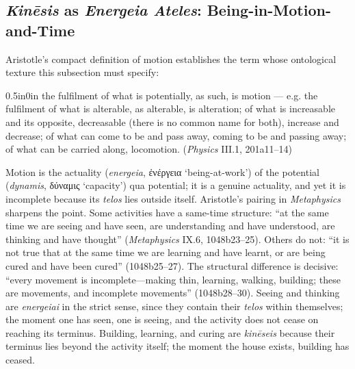 \documentclass{article}
\newcommand{\gk}[1]{{\greekfont #1}}
\begin{document}
\subsection{\textit{Kinēsis} as \textit{Energeia Ateles}: Being-in-Motion-and-Time}

Aristotle's compact definition of motion establishes the term whose ontological texture this subsection must specify:
\begin{adjustwidth}{0.5in}{0in}
the fulfilment of what is potentially, as such, is motion --- e.g. the fulfilment of what is alterable, as alterable, is alteration; of what is increasable and its opposite, decreasable (there is no common name for both), increase and decrease; of what can come to be and pass away, coming to be and passing away; of what can be carried along, locomotion. (\textit{Physics} III.1, 201a11--14)
\end{adjustwidth}
Motion is the actuality (\textit{energeia}, \gk{ἐνέργεια} `being-at-work') of the potential (\textit{dynamis}, \gk{δύναμις} `capacity') qua potential; it is a genuine actuality, and yet it is incomplete because its \textit{telos} lies outside itself. Aristotle's pairing in \textit{Metaphysics} sharpens the point. Some activities have a same-time structure: ``at the same time we are seeing and have seen, are understanding and have understood, are thinking and have thought'' (\textit{Metaphysics} IX.6, 1048b23--25). Others do not: ``it is not true that at the same time we are learning and have learnt, or are being cured and have been cured'' (1048b25--27). The structural difference is decisive: ``every movement is incomplete---making thin, learning, walking, building; these are movements, and incomplete movements'' (1048b28--30). Seeing and thinking are \textit{energeiai} in the strict sense, since they contain their \textit{telos} within themselves; the moment one has seen, one is seeing, and the activity does not cease on reaching its terminus. Building, learning, and curing are \textit{kinēseis} because their terminus lies beyond the activity itself; the moment the house exists, building has ceased.
\end{document}
